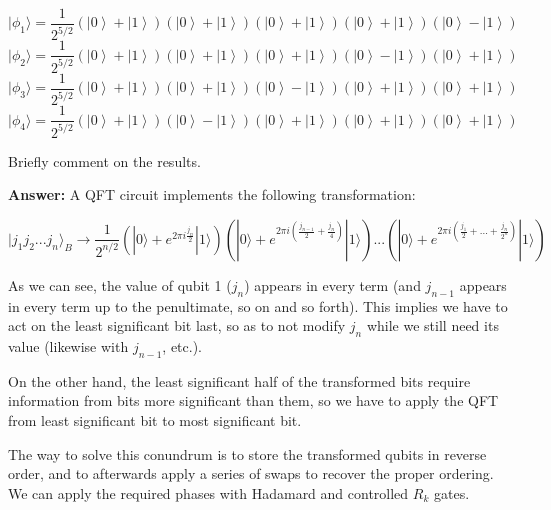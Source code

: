 \documentclass[11pt]{article}
\begin{document}
\[ |\phi_1\rangle = \frac{1}{2^{5/2}}\left(\left|0\right\rangle+\left|1\right\rangle\right)\left(\left|0\right\rangle+\left|1\right\rangle\right)\left(\left|0\right\rangle+\left|1\right\rangle\right)\left(\left|0\right\rangle+\left|1\right\rangle\right)\left(\left|0\right\rangle-\left|1\right\rangle\right)\]
\[ |\phi_2\rangle = \frac{1}{2^{5/2}}\left(\left|0\right\rangle+\left|1\right\rangle\right)\left(\left|0\right\rangle+\left|1\right\rangle\right)\left(\left|0\right\rangle+\left|1\right\rangle\right)\left(\left|0\right\rangle-\left|1\right\rangle\right)\left(\left|0\right\rangle+\left|1\right\rangle\right)\]
\[ |\phi_3\rangle = \frac{1}{2^{5/2}}\left(\left|0\right\rangle+\left|1\right\rangle\right)\left(\left|0\right\rangle+\left|1\right\rangle\right)\left(\left|0\right\rangle-\left|1\right\rangle\right)\left(\left|0\right\rangle+\left|1\right\rangle\right)\left(\left|0\right\rangle+\left|1\right\rangle\right)\]
\[ |\phi_4\rangle = \frac{1}{2^{5/2}}\left(\left|0\right\rangle+\left|1\right\rangle\right)\left(\left|0\right\rangle-\left|1\right\rangle\right)\left(\left|0\right\rangle+\left|1\right\rangle\right)\left(\left|0\right\rangle+\left|1\right\rangle\right)\left(\left|0\right\rangle+\left|1\right\rangle\right)\]

Briefly comment on the results.

\textbf{Answer:} A QFT circuit implements the following transformation:

\[
|j_1j_2...j_n\rangle_B\rightarrow \frac{1}{2^{n/2}}
\left(|0\rangle + e^{2\pi i \frac{j_n}{2}}|1\rangle \right) 
\left(|0\rangle + e^{2\pi i (\frac{j_{n-1}}{2}+\frac{j_n}{4})}|1\rangle \right)
... 
\left(|0\rangle + e^{2\pi i (\frac{j_1}{2}+...+\frac{j_n}{2^n})}|1\rangle \right) 
\]

As we can see, the value of qubit 1 (\(j_n\)) appears in every term (and
\(j_{n-1}\) appears in every term up to the penultimate, so on and so
forth). This implies we have to act on the least significant bit last,
so as to not modify \(j_n\) while we still need its value (likewise with
\(j_{n-1}\), etc.).

On the other hand, the least significant half of the transformed bits
require information from bits more significant than them, so we have to
apply the QFT from least significant bit to most significant bit.

The way to solve this conundrum is to store the transformed qubits in
reverse order, and to afterwards apply a series of swaps to recover the
proper ordering. We can apply the required phases with Hadamard and
controlled \(R_k\) gates.
\end{document}
